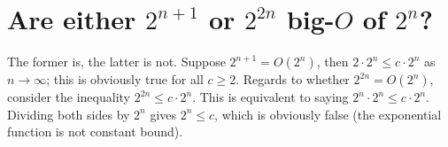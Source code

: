 \section[Problem 4]{Are either $2^{n + 1}$ or $2^{2n}$ big-$O$ of $2^n$?}

The former is, the latter is not. Suppose $2^{n + 1} = O(2^n)$, then $2 \cdot 2^n \leq c \cdot 2^n$ as $n \rightarrow \infty$; this is obviously true for all $c \geq 2$. Regards to whether $2^{2n} = O(2^n)$, consider the inequality $2^{2n} \leq c \cdot 2^n$. This is equivalent to saying $2^n \cdot 2^n \leq c \cdot 2^n$. Dividing both sides by $2^n$ gives $2^n \leq c$, which is obviously false (the exponential function is not constant bound).
